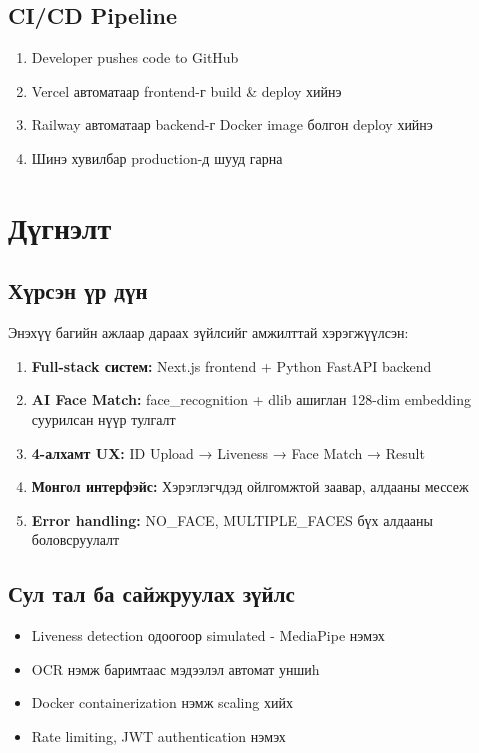 \documentclass[12pt,a4paper]{article}
\begin{document}
\subsection{CI/CD Pipeline}

\begin{enumerate}[leftmargin=1.2cm]
  \item Developer pushes code to GitHub
  \item Vercel автоматаар frontend-г build \& deploy хийнэ
  \item Railway автоматаар backend-г Docker image болгон deploy хийнэ
  \item Шинэ хувилбар production-д шууд гарна
\end{enumerate}

\section{Дүгнэлт}

\subsection{Хүрсэн үр дүн}

Энэхүү багийн ажлаар дараах зүйлсийг амжилттай хэрэгжүүлсэн:

\begin{enumerate}[leftmargin=1.2cm]
  \item \textbf{Full-stack систем:} Next.js frontend + Python FastAPI backend
  \item \textbf{AI Face Match:} face\_recognition + dlib ашиглан 128-dim embedding суурилсан нүүр тулгалт
  \item \textbf{4-алхамт UX:} ID Upload → Liveness → Face Match → Result
  \item \textbf{Монгол интерфэйс:} Хэрэглэгчдэд ойлгомжтой заавар, алдааны мессеж
  \item \textbf{Error handling:} NO\_FACE, MULTIPLE\_FACES бүх алдааны боловсруулалт
\end{enumerate}

\subsection{Сул тал ба сайжруулах зүйлс}

\begin{itemize}[leftmargin=1cm]
  \item Liveness detection одоогоор simulated - MediaPipe нэмэх
  \item OCR нэмж баримтаас мэдээлэл автомат уншиh
  \item Docker containerization нэмж scaling хийх
  \item Rate limiting, JWT authentication нэмэх
\end{itemize}
\end{document}
